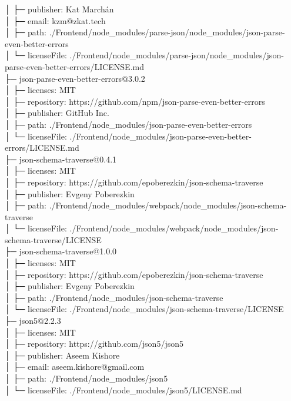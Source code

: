 │  ├─ publisher: Kat Marchán\\
│  ├─ email: kzm@zkat.tech\\
│  ├─ path: ./Frontend/node\_modules/parse-json/node\_modules/json-parse-even-better-errors\\
│  └─ licenseFile: ./Frontend/node\_modules/parse-json/node\_modules/json-parse-even-better-errors/LICENSE.md\\
├─ json-parse-even-better-errors@3.0.2\\
│  ├─ licenses: MIT\\
│  ├─ repository: https://github.com/npm/json-parse-even-better-errors\\
│  ├─ publisher: GitHub Inc.\\
│  ├─ path: ./Frontend/node\_modules/json-parse-even-better-errors\\
│  └─ licenseFile: ./Frontend/node\_modules/json-parse-even-better-errors/LICENSE.md\\
├─ json-schema-traverse@0.4.1\\
│  ├─ licenses: MIT\\
│  ├─ repository: https://github.com/epoberezkin/json-schema-traverse\\
│  ├─ publisher: Evgeny Poberezkin\\
│  ├─ path: ./Frontend/node\_modules/webpack/node\_modules/json-schema-traverse\\
│  └─ licenseFile: ./Frontend/node\_modules/webpack/node\_modules/json-schema-traverse/LICENSE\\
├─ json-schema-traverse@1.0.0\\
│  ├─ licenses: MIT\\
│  ├─ repository: https://github.com/epoberezkin/json-schema-traverse\\
│  ├─ publisher: Evgeny Poberezkin\\
│  ├─ path: ./Frontend/node\_modules/json-schema-traverse\\
│  └─ licenseFile: ./Frontend/node\_modules/json-schema-traverse/LICENSE\\
├─ json5@2.2.3\\
│  ├─ licenses: MIT\\
│  ├─ repository: https://github.com/json5/json5\\
│  ├─ publisher: Aseem Kishore\\
│  ├─ email: aseem.kishore@gmail.com\\
│  ├─ path: ./Frontend/node\_modules/json5\\
│  └─ licenseFile: ./Frontend/node\_modules/json5/LICENSE.md\\
